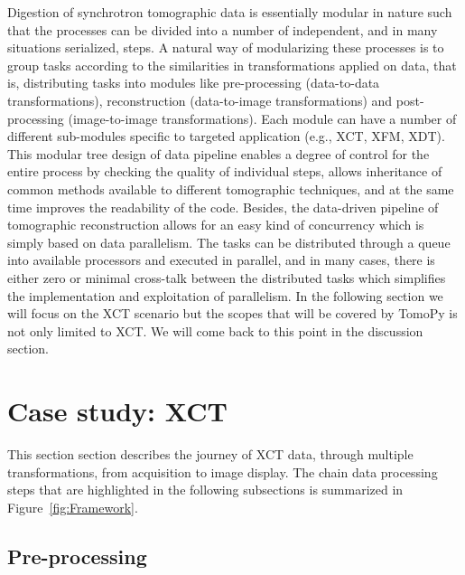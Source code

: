 \documentclass[pdf]{iucr}              %
\begin{document}

Digestion of synchrotron tomographic data is essentially modular in nature such that the processes can be divided into a number of independent, and in many situations serialized, steps. A natural way of modularizing these processes is to group tasks according to the similarities in transformations applied on data, that is, distributing tasks into modules like pre-processing (data-to-data transformations), reconstruction (data-to-image transformations) and post-processing (image-to-image transformations). Each module can have a number of different sub-modules specific to targeted application (e.g., XCT, XFM, XDT). This  modular tree design of data pipeline enables a degree of control for the entire process by checking the quality of individual steps, allows inheritance of common methods available to different tomographic techniques, and at the same time improves the readability of the code. Besides, the data-driven pipeline of tomographic reconstruction allows for an easy kind of concurrency which is simply based on data parallelism. The tasks can be distributed through a queue into available processors and executed in parallel, and in many cases, there is either zero or minimal cross-talk between the distributed tasks which simplifies the implementation and exploitation of parallelism. In the following section we will focus on the XCT scenario but the scopes that will be covered by TomoPy is not only limited to XCT. We will come back to this point in the discussion section.

\section{Case study: XCT} 

This section section describes the journey of XCT data, through multiple transformations, from acquisition to image display. The chain data processing steps that are highlighted in the following subsections is summarized in Figure~\ref{fig:Framework}. 

\subsection{Pre-processing} 
\end{document}
